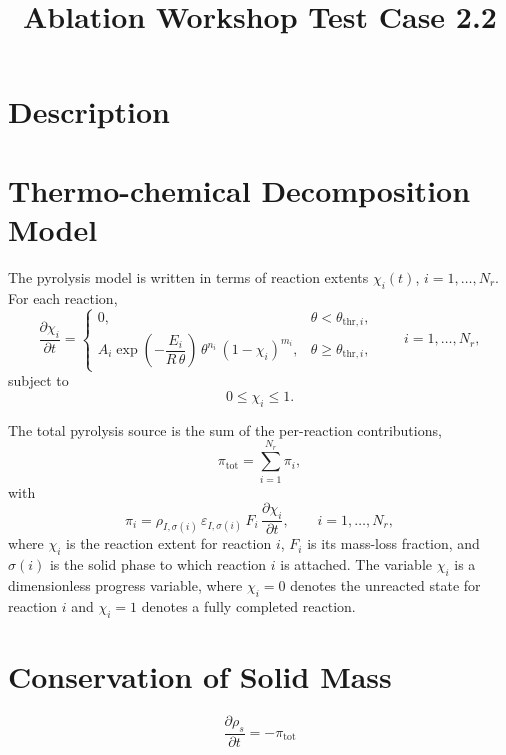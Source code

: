 \documentclass[11pt]{article}
\title{Ablation Workshop Test Case 2.2}
\author{}
\date{}
\begin{document}
\maketitle

\section{Description}

\section{Thermo-chemical Decomposition Model}

The pyrolysis model is written in terms of reaction extents
$\chi_i(t)$, $i=1,\dots,N_r$. For each reaction,
\begin{equation}
\frac{\partial \chi_i}{\partial t}
=
\begin{cases}
0, & \theta < \theta_{\mathrm{thr},i}, \\[0.5em]
A_i \exp\!\left(-\dfrac{E_i}{R\,\theta}\right)\,\theta^{n_i}\,(1-\chi_i)^{m_i},
& \theta \ge \theta_{\mathrm{thr},i},
\end{cases}
\qquad i=1,\dots,N_r,
\end{equation}
subject to
\begin{equation}
0 \le \chi_i \le 1.
\end{equation}

The total pyrolysis source is the sum of the per-reaction contributions,
\begin{equation}
\pi_{\mathrm{tot}} = \sum_{i=1}^{N_r} \pi_i,
\end{equation}
with
\begin{equation}
\pi_i
=
\rho_{I,\sigma(i)}\,\varepsilon_{I,\sigma(i)}\,F_i\,
\frac{\partial \chi_i}{\partial t},
\qquad i=1,\dots,N_r,
\end{equation}
where $\chi_i$ is the reaction extent for reaction $i$, $F_i$ is its mass-loss
fraction, and $\sigma(i)$ is the solid phase to which reaction $i$ is attached.
The variable $\chi_i$ is a dimensionless progress variable, where $\chi_i = 0$
denotes the unreacted state for reaction $i$ and $\chi_i = 1$ denotes a fully
completed reaction.

\section{Conservation of Solid Mass}


\begin{equation}
\frac{\partial \rho_{s}}{\partial t} = - \pi_{\mathrm{tot}}
\end{equation}
\end{document}
